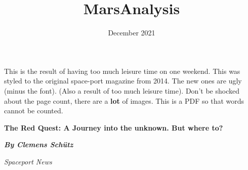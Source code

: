 \documentclass{article}
\title{MarsAnalysis}
\date{December 2021}
\begin{document}
{
    \noindent
    \begin{center}
        \vspace*{\fill}
        This is the result of having too much leisure time on one weekend.
        This was styled to the original space-port magazine from 2014. The new ones are ugly (minus the font).
        (Also a result of too much leisure time).
        Don't be shocked about the page count, there are a \textbf{lot} of images.
        This is a PDF so that words cannot be counted.
        \vspace*{\fill}
    \end{center}
}
\pagebreak


\noindent
{\fontsize{40pt}{42pt}
    \selectfont \noindent \textbf{The Red Quest: A Journey into the unknown. But where to?}
}

\vspace{\baselineskip} %

\noindent %
\textbf{\emph{By Clemens Schütz}} %

\noindent %
\emph{Spaceport News}
\end{document}
